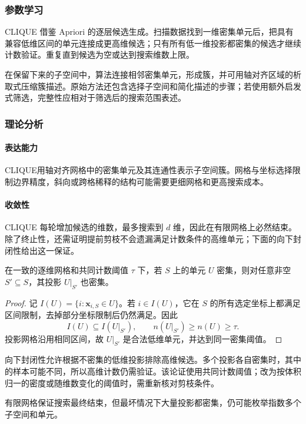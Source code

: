 \subsubsection{参数学习}

CLIQUE 借鉴 Apriori 的逐层候选生成。扫描数据找到一维密集单元后，把具有兼容低维区间的单元连接成更高维候选；只有所有低一维投影都密集的候选才继续计数验证。重复直到候选为空或达到搜索维数上限。

在保留下来的子空间中，算法连接相邻密集单元，形成簇，并可用轴对齐区域的析取式压缩簇描述。原始方法还包含选择子空间和简化描述的步骤；若使用额外启发式筛选，完整性应相对于筛选后的搜索范围表述。

\subsubsection{理论分析}

\paragraph{表达能力}
CLIQUE用轴对齐网格中的密集单元及其连通性表示子空间簇。网格与坐标选择限制边界精度，斜向或跨格稀释的结构可能需要更细网格和更高搜索成本。

\paragraph{收敛性}
CLIQUE 每轮增加候选的维数，最多搜索到 $d$ 维，因此在有限网格上必然结束。除了终止性，还需证明提前剪枝不会遗漏满足计数条件的高维单元；下面的向下封闭性给出这一保证。

\begin{theorem}[子空间密集性的向下封闭性]
 \label{thm:clustering-clique}
 在一致的逐维网格和共同计数阈值 $\tau$ 下，若 $S$ 上的单元 $U$ 密集，则对任意非空 $S'\subseteq S$，其投影 $U|_{S'}$ 也密集。
\end{theorem}
\begin{proof}
记 $I(U)=\{i:\bm{x}_{i,S}\in U\}$。若 $i\in I(U)$，它在 $S$ 的所有选定坐标上都满足区间限制，去掉部分坐标限制后仍然满足。因此
\[
 I(U)\subseteq I(U|_{S'}),\qquad
 n(U|_{S'})\geq n(U)\geq\tau.
\]
投影网格沿用相同区间，故 $U|_{S'}$ 是合法低维单元，并达到同一密集阈值。
\end{proof}

向下封闭性允许根据不密集的低维投影排除高维候选。多个投影各自密集时，其中的样本可能不同，所以高维计数仍需验证。该论证使用共同计数阈值；改为按体积归一的密度或随维数变化的阈值时，需重新核对剪枝条件。

有限网格保证搜索最终结束，但最坏情况下大量投影都密集，仍可能枚举指数多个子空间和单元。

